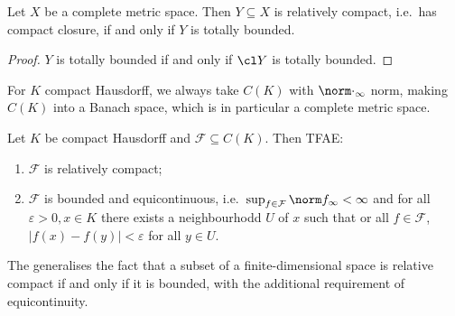 \documentclass[a4paper]{article}
\begin{document}
\begin{corollary}
  Let \(X\) be a complete metric space. Then \(Y \subseteq X\) is relatively compact, i.e.\ has compact closure, if and only if \(Y\) is totally bounded.
\end{corollary}

\begin{proof}
  \(Y\) is totally bounded if and only if \(\cl Y\) is totally bounded.
\end{proof}

For \(K\) compact Hausdorff, we always take \(C(K)\) with \(\norm \cdot_\infty\) norm, making \(C(K)\) into a Banach space, which is in particular a complete metric space.

\begin{theorem}
  Let \(K\) be compact Hausdorff and \(\mathcal F \subseteq C(K)\). Then TFAE:
  \begin{enumerate}
  \item \(\mathcal F\) is relatively compact;
  \item \(\mathcal F\) is bounded and equicontinuous, i.e.\ \(\sup_{f \in \mathcal F} \norm f_\infty < \infty\) and for all \(\varepsilon > 0, x \in K\) there exists a neighbourhodd \(U\) of \(x\) such that or all \(f \in \mathcal F\), \(|f(x) - f(y)| < \varepsilon\) for all \(y \in U\).
  \end{enumerate}
\end{theorem}

The generalises the fact that a subset of a finite-dimensional space is relative compact if and only if it is bounded, with the additional requirement of equicontinuity.
\end{document}

